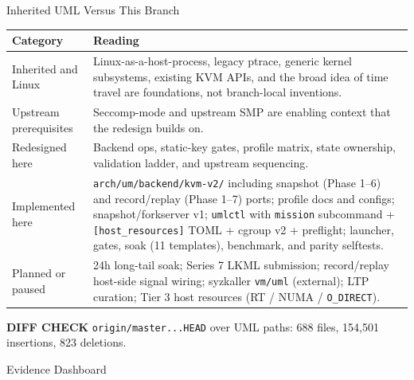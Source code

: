 \documentclass[aspectratio=169,11pt]{beamer}
\newcommand{\pill}[2]{\colorbox{#1!14}{\textcolor{#1}{\footnotesize\textbf{#2}}}}
\begin{document}
\begin{frame}{Inherited UML Versus This Branch}
\scriptsize
\begin{tabularx}{\textwidth}{@{}p{}X@{}}
\toprule
Category & Reading \\
\midrule
Inherited \UML{} and Linux & Linux-as-a-host-process, legacy ptrace,
generic kernel subsystems, existing KVM APIs, and the broad idea of
time travel are foundations, not branch-local inventions. \\
Upstream prerequisites & Seccomp-mode \UML{} and upstream SMP are
enabling context that the redesign builds on. \\
Redesigned here & Backend ops, static-key gates, profile matrix,
\KVMvTwo{} state ownership, validation ladder, and upstream sequencing. \\
Implemented here & \texttt{arch/um/backend/kvm-v2/} including
snapshot (Phase 1--6) and record/replay (Phase 1--7) ports;
profile docs and configs; snapshot/forkserver v1; \texttt{umlctl}
with \texttt{mission} subcommand + \texttt{[host\_resources]} TOML +
cgroup v2 + preflight; launcher, gates, soak (11 templates),
benchmark, and parity selftests. \\
Planned or paused & 24h long-tail soak; Series 7 LKML submission;
record/replay host-side signal wiring; syzkaller \texttt{vm/uml}
(external); LTP curation; Tier 3 host resources (RT / NUMA /
\texttt{O\_DIRECT}). \\
\bottomrule
\end{tabularx}
\vspace{0.55em}
\pill{UMLBlue}{DIFF CHECK}\quad
\texttt{origin/master...HEAD} over UML paths: 688 files, 154{,}501 insertions, 823 deletions.
\end{frame}

\begin{frame}{Evidence Dashboard}
\centering
{}
\end{frame}
\end{document}
